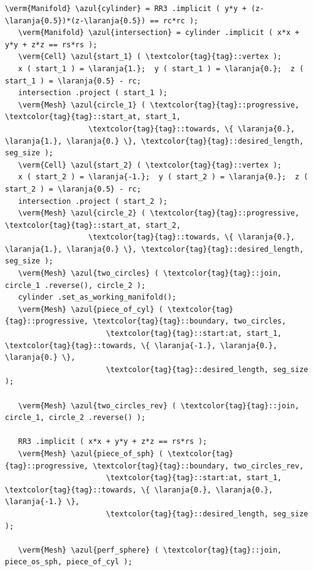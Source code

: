 \begin{Verbatim}[commandchars=\\\{\},formatcom=\small\tt,frame=single,
   label=parag-\ref{\numb section 3.\numb parag 19}.cpp,rulecolor=\color{coment},
   baselinestretch=0.94,framesep=2mm                                            ]
   \verm{Manifold} \azul{cylinder} = RR3 .implicit ( y*y + (z-\laranja{0.5})*(z-\laranja{0.5}) == rc*rc );
   \verm{Manifold} \azul{intersection} = cylinder .implicit ( x*x + y*y + z*z == rs*rs );
   \verm{Cell} \azul{start_1} ( \textcolor{tag}{tag}::vertex );
   x ( start_1 ) = \laranja{1.};  y ( start_1 ) = \laranja{0.};  z ( start_1 ) = \laranja{0.5} - rc;
   intersection .project ( start_1 );
   \verm{Mesh} \azul{circle_1} ( \textcolor{tag}{tag}::progressive, \textcolor{tag}{tag}::start_at, start_1,
                   \textcolor{tag}{tag}::towards, \{ \laranja{0.}, \laranja{1.}, \laranja{0.} \}, \textcolor{tag}{tag}::desired_length, seg_size );
   \verm{Cell} \azul{start_2} ( \textcolor{tag}{tag}::vertex );
   x ( start_2 ) = \laranja{-1.};  y ( start_2 ) = \laranja{0.};  z ( start_2 ) = \laranja{0.5} - rc;
   intersection .project ( start_2 );
   \verm{Mesh} \azul{circle_2} ( \textcolor{tag}{tag}::progressive, \textcolor{tag}{tag}::start_at, start_2,
                   \textcolor{tag}{tag}::towards, \{ \laranja{0.}, \laranja{1.}, \laranja{0.} \}, \textcolor{tag}{tag}::desired_length, seg_size );
   \verm{Mesh} \azul{two_circles} ( \textcolor{tag}{tag}::join, circle_1 .reverse(), circle_2 );
   cylinder .set_as_working_manifold();
   \verm{Mesh} \azul{piece_of_cyl} ( \textcolor{tag}{tag}::progressive, \textcolor{tag}{tag}::boundary, two_circles,
                       \textcolor{tag}{tag}::start:at, start_1, \textcolor{tag}{tag}::towards, \{ \laranja{-1.}, \laranja{0.}, \laranja{0.} \},
                       \textcolor{tag}{tag}::desired_length, seg_size                         );

   \verm{Mesh} \azul{two_circles_rev} ( \textcolor{tag}{tag}::join, circle_1, circle_2 .reverse() );

   RR3 .implicit ( x*x + y*y + z*z == rs*rs );
   \verm{Mesh} \azul{piece_of_sph} ( \textcolor{tag}{tag}::progressive, \textcolor{tag}{tag}::boundary, two_circles_rev,
                       \textcolor{tag}{tag}::start:at, start_1, \textcolor{tag}{tag}::towards, \{ \laranja{0.}, \laranja{0.}, \laranja{-1.} \},
                       \textcolor{tag}{tag}::desired_length, seg_size                         );

   \verm{Mesh} \azul{perf_sphere} ( \textcolor{tag}{tag}::join, piece_os_sph, piece_of_cyl );
\end{Verbatim}


